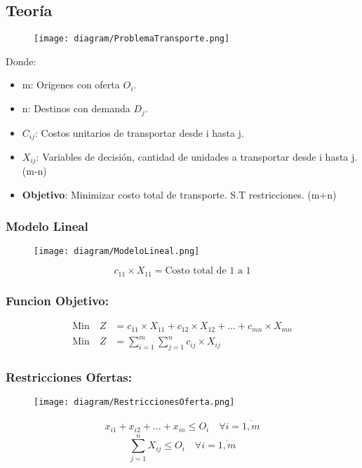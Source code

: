 \documentclass{templateNote}
\begin{document}
\subsection*{Teoría}
\begin{figure}[H]
    \centering
    \texttt{[image: diagram/ProblemaTransporte.png]}
\end{figure}
Donde:
\begin{itemize}
    \item m: Origenes con oferta $O_i$.
    \item n: Destinos con demanda $D_j$.
    \item $C_{ij}$: Costos unitarios de transportar desde i hasta j.
    \item $X_{ij}$: Variables de decisión, cantidad de unidades a transportar desde i hasta j. \textcolor{red!50}{(m-n)}
    \item \textbf{Objetivo}: Minimizar costo total de transporte. S.T restricciones. \textcolor{blue!50}{(m+n)} 
\end{itemize}

\subsubsection*{Modelo Lineal}

\begin{figure}[H]
    \centering
    \texttt{[image: diagram/ModeloLineal.png]}
\end{figure}
\begin{equation*}
    c_{11} \times X_{11} = \text{Costo total de 1 a 1}
\end{equation*}

\subsubsection*{Funcion Objetivo:}
\begin{align*}
    \text{Min} \quad Z &= c_{11} \times X_{11} + c_{12} \times X_{12} + ... + c_{mn} \times X_{mn} \\
    \text{Min} \quad Z &= \sum_{i=1}^{m}{\sum_{j=1}^{n}{c_{ij} \times X_{ij}}}
\end{align*}

\newpage
\subsubsection*{Restricciones Ofertas:}
\begin{figure}[H]
    \centering
    \texttt{[image: diagram/RestriccionesOferta.png]}
\end{figure}
\begin{align*}
    x_{i1} + x_{i2} + ... + x_{in} \leq O_i \quad \forall i = \overline{1,m}
\end{align*}
\begin{equation*}
    \sum_{j=1}^{n}{X_{ij}} \leq O_i \quad \forall i = \overline{1,m}
\end{equation*}
\end{document}
